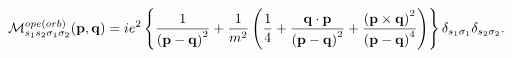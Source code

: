 \begin{equation}
\mathcal{M}_{s_{1}s_{2}\sigma _{1}\sigma _{2}}^{ope\left( orb\right) }(%
\mathbf{p},\mathbf{q})=ie^{2}\left\{ \frac{1}{\left( \mathbf{p-q}\right) ^{2}%
}+\frac{1}{m^{2}}\left( \frac{1}{4}+\frac{\mathbf{q\cdot p}}{\left( \mathbf{%
p-q}\right) ^{2}}+\frac{\left( \mathbf{p}\times \mathbf{q}\right) ^{2}}{%
\left( \mathbf{p}-\mathbf{q}\right) ^{4}}\right) \right\} \delta
_{s_{1}\sigma _{1}}\delta _{s_{2}\sigma _{2}}.
\end{equation}

